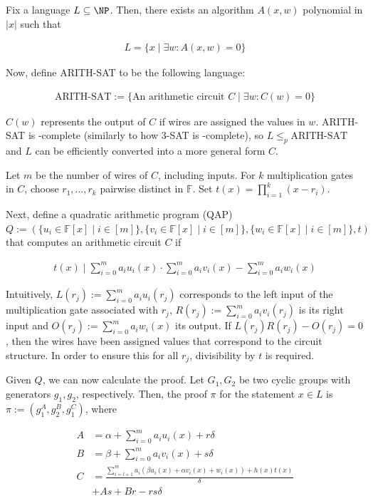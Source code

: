 \documentclass{article}
\begin{document}
Fix a language $L \subseteq \NP$.
Then, there exists an algorithm $A(x, w)$ polynomial in $|x|$ such that

\begin{align*} L = \{ x \mid \exists w\colon A(x, w) = 0\} \end{align*}

Now, define ARITH-SAT to be the following language:

\begin{align*} \text{ARITH-SAT} := \{ \text{An arithmetic circuit } C \mid \exists w\colon C(w) = 0\} \end{align*}

$C(w)$ represents the output of $C$ if wires are assigned the values in $w$.
ARITH-SAT is \NP-complete (similarly to how 3-SAT is \NP-complete), so $L \leq_p \text{ARITH-SAT}$ and $L$ can be efficiently converted into a more general form $C$.

Let $m$ be the number of wires of $C$, including inputs.
For $k$ multiplication gates in $C$, choose $r_1, \ldots, r_k$ pairwise distinct in $\mathbb{F}$.
Set $t(x) = \prod_{i=1}^k(x-r_i)$.


Next, define a quadratic arithmetic program (QAP) $Q := (\{u_i \in \mathbb{F}[x] \mid i \in [m]\}, \{v_i \in \mathbb{F}[x] \mid i \in [m]\}, \{w_i \in \mathbb{F}[x] \mid i \in [m]\}, t)$ that computes an arithmetic circuit $C$ if

\begin{align*}
        t(x) \mid \sum_{i=0}^m a_iu_i(x) \cdot \sum_{i=0}^m a_iv_i(x) - \sum_{i=0}^{m} a_iw_i(x)
\end{align*}

Intuitively, $L(r_j) := \sum_{i=0}^m a_iu_i(r_j)$ corresponds to the left input of the multiplication gate associated with $r_j$,
$R(r_j) := \sum_{i=0}^m a_iv_i(r_j)$ is its right input and $O(r_j) := \sum_{i=0}^{m} a_iw_i(x)$ its output.
If $L(r_j)R(r_j) - O(r_j) = 0$, then the wires have been assigned values that correspond to the circuit structure.
In order to ensure this for all $r_j$, divisibility by $t$ is required.


Given $Q$, we can now calculate the proof. Let $G_1, G_2$ be two cyclic groups with generators $g_1, g_2$, respectively.
Then, the proof $\pi$ for the statement $x \in L$ is $\pi := (g_1^A, g_2^B, g_1^C)$, where

\begin{align}
        A &= \alpha + \sum_{i=0}^m a_iu_i(x) + r\delta \\
        B &= \beta + \sum_{i=0}^m a_iv_i(x) + s\delta \\
        C &= \frac{\sum_{i=l+1}^m a_i(\beta u_i(x) + \alpha v_i(x) + w_i(x)) + h(x)t(x)}{\delta} \\
        & + As + Br - rs\delta \nonumber
\end{align}
\end{document}
